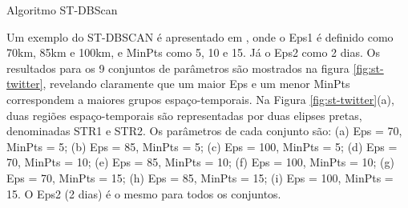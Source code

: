 \pagebreak
\begin{algorithm}[!ht]
	\SetSpacedAlgorithm
	\caption{\label{alg:algoritmo_stdbscan}Algoritmo ST-DBScan}
\end{algorithm}

Um exemplo do ST-DBSCAN é apresentado em \cite{st-twitter}, onde o Eps1 é definido como 70km, 85km e 100km, e MinPts como 5, 10 e 15. Já o Eps2 como 2 dias. Os resultados para os 9 conjuntos de parâmetros são mostrados na figura \ref{fig:st-twitter}, revelando claramente que um maior Eps e um menor MinPts correspondem a maiores grupos espaço-temporais. Na Figura \ref{fig:st-twitter}(a), duas regiões espaço-temporais são representadas por duas elipses pretas, denominadas STR1 e STR2.
Os parâmetros de cada conjunto são:
(a) Eps = 70, MinPts = 5; (b) Eps = 85, MinPts = 5; (c) Eps = 100, MinPts = 5; (d) Eps = 70, MinPts = 10; (e) Eps = 85, MinPts = 10; (f) Eps = 100, MinPts = 10; (g) Eps = 70, MinPts = 15; (h) Eps = 85, MinPts = 15; (i) Eps = 100, MinPts = 15. O Eps2 (2 dias) é o mesmo para todos os conjuntos.

